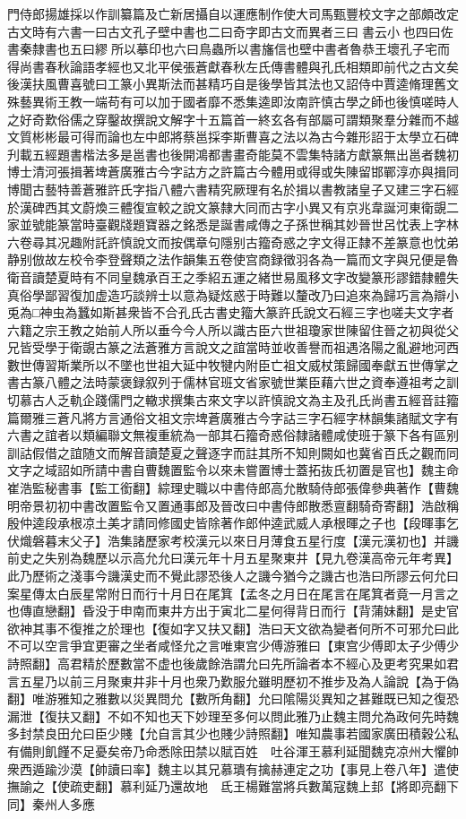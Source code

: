 門侍郎揚雄採以作訓纂篇及亡新居攝自以運應制作使大司馬甄豐校文字之部頗改定古文時有六書一曰古文孔子壁中書也二曰奇字即古文而異者三曰書云小也四曰佐書秦隸書也五曰繆所以摹印也六曰鳥蟲所以書旛信也壁中書者魯恭王壞孔子宅而得尚書春秋論語孝經也又北平侯張蒼獻春秋左氏傳書體與孔氏相類即前代之古文矣後漢扶風曹喜號曰工篆小異斯法而甚精巧自是後學皆其法也又詔侍中賈逵脩理舊文殊藝異術王教一端苟有可以加于國者靡不悉集逵即汝南許慎古學之師也後慎嗟時人之好奇歎俗儒之穿鑿故撰說文解字十五篇首一終玄各有部屬可謂類聚羣分雜而不越文質彬彬最可得而論也左中郎將蔡邕採李斯曹喜之法以為古今雜形詔于太學立石碑刋載五經題書楷法多是邕書也後開鴻都書畫奇能莫不雲集特諸方獻篆無出邕者魏初博士清河張揖著埤蒼廣雅古今字詁方之許篇古今體用或得或失陳留邯鄲淳亦與揖同博聞古藝特善蒼雅許氏字指八體六書精究厥理有名於揖以書教諸皇子又建三字石經於漢碑西其文蔚煥三體復宣較之說文篆隸大同而古字小異又有京兆韋誕河東衛覬二家並號能篆當時臺觀牋題寶器之銘悉是誕書咸傳之子孫世稱其妙晉世呂忱表上字林六卷尋其况趣附託許慎說文而按偶章句隱别古籀奇惑之字文得正隸不差篆意也忱弟静别倣故左校令李登聲類之法作韻集五卷使宫商録徵羽各為一篇而文字與兄便是魯衛音讀楚夏時有不同皇魏承百王之季紹五運之緒世易風移文字改變篆形謬錯隸體失真俗學鄙習復加虚造巧談辨士以意為疑炫惑于時難以釐改乃曰追來為歸巧言為辯小兎為□神虫為蠶如斯甚衆皆不合孔氏古書史籀大篆許氏說文石經三字也嗟夫文字者六籍之宗王教之始前人所以垂今今人所以識古臣六世祖瓊家世陳留住晉之初與從父兄皆受學于衛覬古篆之法蒼雅方言說文之誼當時並收善譽而祖遇洛陽之亂避地河西數世傳習斯業所以不墜也世祖大延中牧犍内附臣亡祖文威杖策歸國奉獻五世傳掌之書古篆八體之法時蒙褒録叙列于儒林官班文省家號世業臣藉六世之資奉遵祖考之訓切慕古人乏軌企踐儒門之轍求撰集古來文字以許慎說文為主及孔氏尚書五經音註籀篇爾雅三蒼凡將方言通俗文祖文宗埤蒼廣雅古今字詁三字石經字林韻集諸賦文字有六書之誼者以類編聯文無複重統為一部其石籀奇惑俗隸諸體咸使班于篆下各有區别訓詁假借之誼随文而解音讀楚夏之聲逐字而註其所不知則闕如也冀省百氏之觀而同文字之域詔如所請中書自曹魏置監令以來未嘗置博士蓋拓抜氏初置是官也】魏主命崔浩監秘書事【監工銜翻】綜理史職以中書侍郎高允散騎侍郎張偉參典著作【曹魏明帝景初初中書改置監令又置通事郎及晉改曰中書侍郎散悉亶翻騎奇寄翻】浩啟稱殷仲逵段承根凉土美才請同修國史皆除著作郎仲逵武威人承根暉之子也【段暉事乞伏熾磐暮末父子】浩集諸歷家考校漢元以來日月薄食五星行度【漢元漢初也】并譏前史之失别為魏歷以示高允允曰漢元年十月五星聚東井【見九卷漢高帝元年考異】此乃歷術之淺事今譏漢史而不覺此謬恐後人之譏今猶今之譏古也浩曰所謬云何允曰案星傳太白辰星常附日而行十月日在尾箕【孟冬之月日在尾言在尾箕者竟一月言之也傳直戀翻】昏没于申南而東井方出于寅北二星何得背日而行【背蒲妹翻】是史官欲神其事不復推之於理也【復如字又扶又翻】浩曰天文欲為變者何所不可邪允曰此不可以空言爭宜更審之坐者咸怪允之言唯東宫少傅游雅曰【東宫少傅即太子少傅少詩照翻】高君精於歷數當不虚也後歲餘浩謂允曰先所論者本不經心及更考究果如君言五星乃以前三月聚東井非十月也衆乃歎服允雖明歷初不推步及為人論說【為于偽翻】唯游雅知之雅數以災異問允【數所角翻】允曰隂陽災異知之甚難既已知之復恐漏泄【復扶又翻】不如不知也天下妙理至多何以問此雅乃止魏主問允為政何先時魏多封禁良田允曰臣少賤【允自言其少也賤少詩照翻】唯知農事若國家廣田積穀公私有備則飢饉不足憂矣帝乃命悉除田禁以賦百姓　吐谷渾王慕利延聞魏克凉州大懼帥衆西遁踰沙漠【帥讀曰率】魏主以其兄慕璝有擒赫連定之功【事見上卷八年】遣使撫諭之【使疏吏翻】慕利延乃還故地　氐王楊難當將兵數萬寇魏上邽【將即亮翻下同】秦州人多應